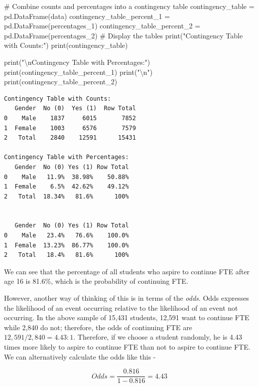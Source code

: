 \documentclass[
  letterpaper,
  DIV=11,
  numbers=noendperiod]{scrreprt}
\newenvironment{Shaded}{\begin{snugshade}}{\end{snugshade}}
\newcommand{\BuiltInTok}[1]{\textcolor[rgb]{0.00,0.23,0.31}{#1}}
\newcommand{\CharTok}[1]{\textcolor[rgb]{0.13,0.47,0.30}{#1}}
\newcommand{\CommentTok}[1]{\textcolor[rgb]{0.37,0.37,0.37}{#1}}
\newcommand{\NormalTok}[1]{\textcolor[rgb]{0.00,0.23,0.31}{#1}}
\newcommand{\OperatorTok}[1]{\textcolor[rgb]{0.37,0.37,0.37}{#1}}
\newcommand{\StringTok}[1]{\textcolor[rgb]{0.13,0.47,0.30}{#1}}
\begin{document}
\begin{tcolorbox}
\begin{Shaded}
\begin{Highlighting}[]
\CommentTok{\# Combine counts and percentages into a contingency table}
\NormalTok{contingency\_table }\OperatorTok{=}\NormalTok{ pd.DataFrame(data)}
\NormalTok{contingency\_table\_percent\_1 }\OperatorTok{=}\NormalTok{ pd.DataFrame(percentages\_1)}
\NormalTok{contingency\_table\_percent\_2 }\OperatorTok{=}\NormalTok{ pd.DataFrame(percentages\_2)}
\CommentTok{\# Display the tables}
\BuiltInTok{print}\NormalTok{(}\StringTok{"Contingency Table with Counts:"}\NormalTok{)}
\BuiltInTok{print}\NormalTok{(contingency\_table)}

\BuiltInTok{print}\NormalTok{(}\StringTok{"}\CharTok{\textbackslash{}n}\StringTok{Contingency Table with Percentages:"}\NormalTok{)}
\BuiltInTok{print}\NormalTok{(contingency\_table\_percent\_1)}
\BuiltInTok{print}\NormalTok{(}\StringTok{"}\CharTok{\textbackslash{}n}\StringTok{"}\NormalTok{)}
\BuiltInTok{print}\NormalTok{(contingency\_table\_percent\_2)}
\end{Highlighting}
\end{Shaded}

\begin{verbatim}
Contingency Table with Counts:
   Gender  No (0)  Yes (1)  Row Total
0    Male    1837     6015       7852
1  Female    1003     6576       7579
2   Total    2840    12591      15431

Contingency Table with Percentages:
   Gender  No (0) Yes (1) Row Total
0    Male   11.9%  38.98%    50.88%
1  Female    6.5%  42.62%    49.12%
2   Total  18.34%   81.6%      100%


   Gender  No (0) Yes (1) Row Total
0    Male   23.4%   76.6%    100.0%
1  Female  13.23%  86.77%    100.0%
2   Total   18.4%   81.6%      100%
\end{verbatim}

We can see that the percentage of all students who aspire to continue
FTE after age 16 is 81.6\%, which is the probability of continuing FTE.

However, another way of thinking of this is in terms of the \emph{odds}.
Odds expresses the likelihood of an event occurring relative to the
likelihood of an event not occurring. In the above sample of 15,431
students, 12,591 want to continue FTE while 2,840 do not; therefore, the
odds of continuing FTE are \(12,591/2,840 = 4.43:1\). Therefore, if we
choose a student randomly, he is 4.43 times more likely to aspire to
continue FTE than not to aspire to continue FTE. We can alternatively
calculate the odds like this -

\[
Odds = \frac{0.816}{1-0.816} = 4.43
\]


\end{tcolorbox}
\end{document}
